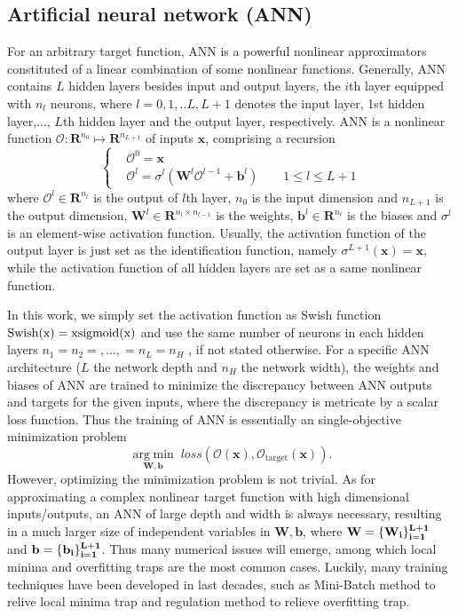 \documentclass[preprint, 10pt]{elsarticle}
\begin{document}
\subsection{Artificial neural network (ANN) }
For an arbitrary target function, ANN is a powerful nonlinear approximators constituted of a linear combination of some nonlinear functions. Generally, ANN contains $L$ hidden layers besides input and output layers,  the $i$th layer equipped with $n_l$ neurons, where $l=0,1,..L,L+1$ denotes the input layer, 1st hidden layer,..., $L$th hidden layer and the output layer, respectively. ANN is a nonlinear function $\mathcal{O}: \mathbf{R}^{n_0} \mapsto \mathbf{R}^{n_{L+1}}$ of inputs $\mathbf{x}$, comprising a  recursion
\begin{equation}
\left \{
\begin{aligned}
&\mathcal{O}^{0}   = \mathbf{x} \\
&\mathcal{O}^{l}   = \sigma ^{l} \left( \mathbf{W}^{l} \mathcal{O}^{l-1} + \mathbf{b}^{l}
\right)
\qquad 1 \le l \le L+1
\end{aligned}
\right.
\end{equation}
where $\mathcal{O}^{l} \in \mathbf{R}^{n_l}$ is the output of $l$th layer, $n_0$ is the input dimension and $n_{L+1}$ is the output dimension, $\mathbf{W}^{l} \in \mathbf{R}^{n_{l} \times n_{l-1}}$ is the weights, $\mathbf{b}^{l} \in \mathbf{R}^{n_l}$ is the biases and $\sigma ^{l}$ is an element-wise activation function. Usually, the activation function of the output layer is just set as the identification function, namely $\sigma ^{L+1}\left(\mathbf{x}\right)=\mathbf{x}$, while the activation function of all hidden layers are set as a same nonlinear function.

In this work, we simply set the activation function as Swish function $ \rm{Swish}(x) =x \text{sigmoid}(x)$ and use the same number of neurons in each hidden layers $n_1=n_2=,...,=n_L=n_H$ , if not stated otherwise. For a specific ANN architecture ($L$ the network depth and $n_H$ the network width), the weights and biases of ANN are trained to minimize the discrepancy between ANN outputs and targets for the given inputs, where the discrepancy is metricate by a scalar loss function. Thus the training of ANN is essentially an single-objective minimization problem
\begin{equation}
\mathop {\arg \;\min }\limits_{{\mathbf{W,b}}} \;
loss\left( {\mathcal{O}\left(\mathbf{x}\right),\mathcal{O}_\text{target} \left(\mathbf{x}\right)} \right)
.
\end{equation}
However, optimizing the minimization problem is not trivial. As for approximating a complex nonlinear target function with high dimensional inputs/outputs, an ANN of large depth and width is always necessary, resulting in a much larger size of independent variables in $\mathbf{W,b}$, where $\bf{W}=\{W_i\}_{i=1}^{L+1}$ and $\bf{b}=\{b_i\}_{i=1}^{L+1}$. Thus many numerical issues will emerge, among which local minima and overfitting traps are the most common cases. Luckily, many training techniques have been developed in last decades, such as Mini-Batch method to relive local minima trap and regulation method to relieve overfitting trap.
\end{document}
